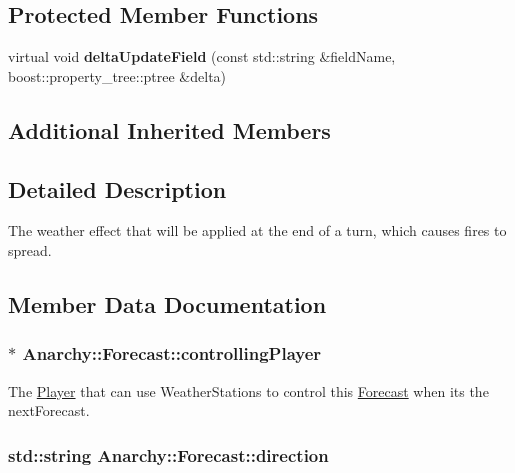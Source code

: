 \subsection*{Protected Member Functions}
\begin{DoxyCompactItemize}
\item 
\hypertarget{classAnarchy_1_1Forecast_a231e15518a6467e6237a6eb55ca50c8a}{virtual void {\bfseries delta\-Update\-Field} (const std\-::string \&field\-Name, boost\-::property\-\_\-tree\-::ptree \&delta)}\label{classAnarchy_1_1Forecast_a231e15518a6467e6237a6eb55ca50c8a}

\end{DoxyCompactItemize}
\subsection*{Additional Inherited Members}


\subsection{Detailed Description}
The weather effect that will be applied at the end of a turn, which causes fires to spread. 



\subsection{Member Data Documentation}
\hypertarget{classAnarchy_1_1Forecast_a3e6c133fea0591d299943a5e3216211d}{
\subsubsection[{controlling\-Player}]{$\ast$ Anarchy\-::\-Forecast\-::controlling\-Player}}\label{classAnarchy_1_1Forecast_a3e6c133fea0591d299943a5e3216211d}


The \hyperlink{classAnarchy_1_1Player}{Player} that can use Weather\-Stations to control this \hyperlink{classAnarchy_1_1Forecast}{Forecast} when its the next\-Forecast. 

\hypertarget{classAnarchy_1_1Forecast_ae1e9bbacab6d18bbec3cbb0e5a33756b}{
\subsubsection[{direction}]{\setlength{\rightskip}{0pt plus 5cm}std\-::string Anarchy\-::\-Forecast\-::direction}}\label{classAnarchy_1_1Forecast_ae1e9bbacab6d18bbec3cbb0e5a33756b}


